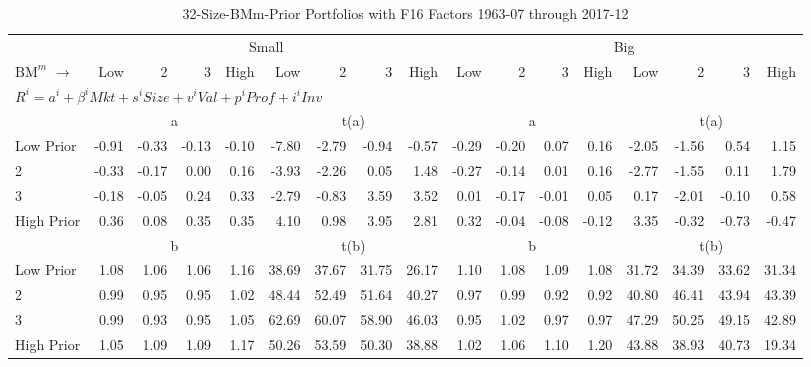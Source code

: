
\begin{table}[!ht]
\footnotesize
\centering
\caption{32-Size-BMm-Prior Portfolios with F16 Factors 1963-07 through 2017-12}
\begin{tabular}{lrrrrrrrrrrrrrrrr}
  \toprule
     & \multicolumn{8}{c}{Small} & \multicolumn{8}{c}{Big}  \\
     \cmidrule(r){2-9} \cmidrule(r){10-17}
    $\text{BM}^{m}$ $\rightarrow$ & Low & 2 & 3 & High & Low & 2 & 3 & High & Low & 2 & 3 & High & Low & 2 & 3 & High  \\ 
  \midrule
  \multicolumn{17}{l}{$R^i=a^i+\beta^iMkt+s^iSize+v^iVal+p^iProf+i^iInv$}  \\
  
     & \multicolumn{4}{c}{a} & \multicolumn{4}{c}{t(a)}  & \multicolumn{4}{c}{a} & \multicolumn{4}{c}{t(a)}   \\
     \cmidrule(r){2-5} \cmidrule(r){6-9}  \cmidrule(r){10-13} \cmidrule(r){14-17} 
    Low Prior  & -0.91  & -0.33  & -0.13  & -0.10  & -7.80  & -2.79  & -0.94  & -0.57  & -0.29  & -0.20  & 0.07  & 0.16  & -2.05  & -1.56  & 0.54  & 1.15   \\
    2  & -0.33  & -0.17  & 0.00  & 0.16  & -3.93  & -2.26  & 0.05  & 1.48  & -0.27  & -0.14  & 0.01  & 0.16  & -2.77  & -1.55  & 0.11  & 1.79   \\
    3  & -0.18  & -0.05  & 0.24  & 0.33  & -2.79  & -0.83  & 3.59  & 3.52  & 0.01  & -0.17  & -0.01  & 0.05  & 0.17  & -2.01  & -0.10  & 0.58   \\
    High Prior  & 0.36  & 0.08  & 0.35  & 0.35  & 4.10  & 0.98  & 3.95  & 2.81  & 0.32  & -0.04  & -0.08  & -0.12  & 3.35  & -0.32  & -0.73  & -0.47   \\
    
  
     & \multicolumn{4}{c}{b} & \multicolumn{4}{c}{t(b)}  & \multicolumn{4}{c}{b} & \multicolumn{4}{c}{t(b)}   \\
     \cmidrule(r){2-5} \cmidrule(r){6-9}  \cmidrule(r){10-13} \cmidrule(r){14-17} 
    Low Prior  & 1.08  & 1.06  & 1.06  & 1.16  & 38.69  & 37.67  & 31.75  & 26.17  & 1.10  & 1.08  & 1.09  & 1.08  & 31.72  & 34.39  & 33.62  & 31.34   \\
    2  & 0.99  & 0.95  & 0.95  & 1.02  & 48.44  & 52.49  & 51.64  & 40.27  & 0.97  & 0.99  & 0.92  & 0.92  & 40.80  & 46.41  & 43.94  & 43.39   \\
    3  & 0.99  & 0.93  & 0.95  & 1.05  & 62.69  & 60.07  & 58.90  & 46.03  & 0.95  & 1.02  & 0.97  & 0.97  & 47.29  & 50.25  & 49.15  & 42.89   \\
    High Prior  & 1.05  & 1.09  & 1.09  & 1.17  & 50.26  & 53.59  & 50.30  & 38.88  & 1.02  & 1.06  & 1.10  & 1.20  & 43.88  & 38.93  & 40.73  & 19.34   \\
    

\end{tabular}
\end{table}
